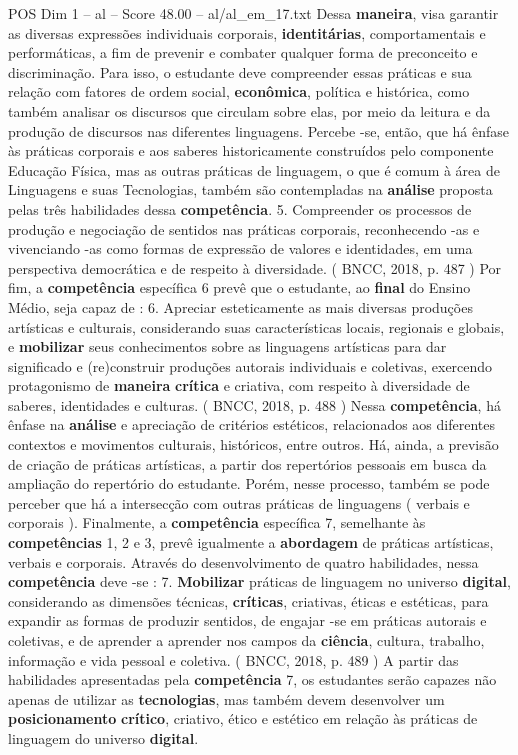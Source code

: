 \begin{textsample}{POS Dim 1 – al – Score 48.00 – al/al\_em\_17.txt}
Dessa \textbf{maneira}, visa garantir as diversas expressões individuais corporais, \textbf{identitárias}, comportamentais e performáticas, a fim de prevenir e combater qualquer forma de preconceito e discriminação.
Para isso, o estudante deve compreender essas práticas e sua relação com fatores de ordem social, \textbf{econômica}, política e histórica, como também analisar os discursos que circulam sobre elas, por meio da leitura e da produção de discursos nas diferentes linguagens.
Percebe -se, então, que há ênfase às práticas corporais e aos saberes historicamente construídos pelo componente Educação Física, mas as outras práticas de linguagem, o que é comum à área de Linguagens e suas Tecnologias, também são contempladas na \textbf{análise} proposta pelas três habilidades dessa \textbf{competência}. 5.
Compreender os processos de produção e negociação de sentidos nas práticas corporais, reconhecendo -as e vivenciando -as como formas de expressão de valores e identidades, em uma perspectiva democrática e de respeito à diversidade. ( BNCC, 2018, p. 487 ) Por fim, a \textbf{competência} específica 6 prevê que o estudante, ao \textbf{final} do Ensino Médio, seja capaz de : 6.
Apreciar esteticamente as mais diversas produções artísticas e culturais, considerando suas características locais, regionais e globais, e \textbf{mobilizar} seus conhecimentos sobre as linguagens artísticas para dar significado e (re)construir produções autorais individuais e coletivas, exercendo protagonismo de \textbf{maneira} \textbf{crítica} e criativa, com respeito à diversidade de saberes, identidades e culturas. ( BNCC, 2018, p. 488 ) Nessa \textbf{competência}, há ênfase na \textbf{análise} e apreciação de critérios estéticos, relacionados aos diferentes contextos e movimentos culturais, históricos, entre outros.
Há, ainda, a previsão de criação de práticas artísticas, a partir dos repertórios pessoais em busca da ampliação do repertório do estudante.
Porém, nesse processo, também se pode perceber que há a intersecção com outras práticas de linguagens ( verbais e corporais ).
Finalmente, a \textbf{competência} específica 7, semelhante às \textbf{competências} 1, 2 e 3, prevê igualmente a \textbf{abordagem} de práticas artísticas, verbais e corporais.
Através do desenvolvimento de quatro habilidades, nessa \textbf{competência} deve -se : 7. \textbf{Mobilizar} práticas de linguagem no universo \textbf{digital}, considerando as dimensões técnicas, \textbf{críticas}, criativas, éticas e estéticas, para expandir as formas de produzir sentidos, de engajar -se em práticas autorais e coletivas, e de aprender a aprender nos campos da \textbf{ciência}, cultura, trabalho, informação e vida pessoal e coletiva. ( BNCC, 2018, p. 489 ) A partir das habilidades apresentadas pela \textbf{competência} 7, os estudantes serão capazes não apenas de utilizar as \textbf{tecnologias}, mas também devem desenvolver um \textbf{posicionamento} \textbf{crítico}, criativo, ético e estético em relação às práticas de linguagem do universo \textbf{digital}.

\end{textsample}
